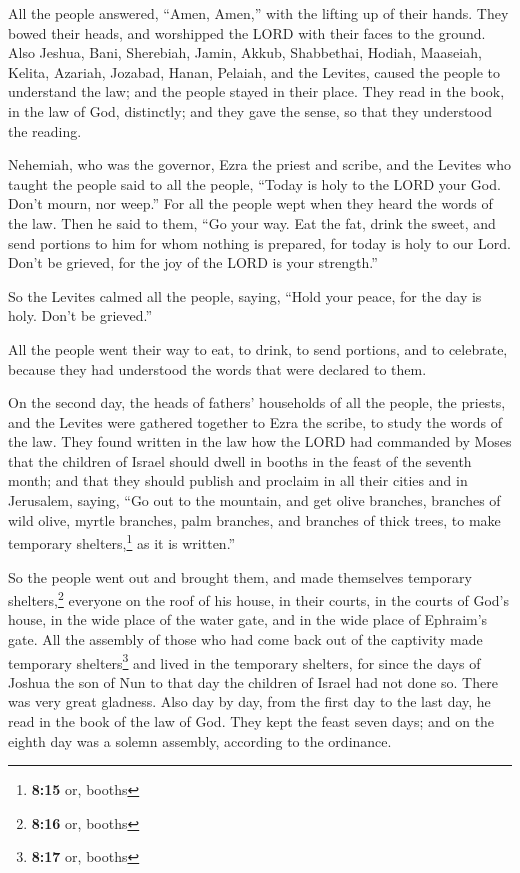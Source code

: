 All the people answered, ``Amen, Amen,'' with the lifting up of their
hands. They bowed their heads, and worshipped the LORD with their faces
to the ground.  Also Jeshua, Bani, Sherebiah, Jamin,
Akkub, Shabbethai, Hodiah, Maaseiah, Kelita, Azariah, Jozabad, Hanan,
Pelaiah, and the Levites, caused the people to understand the law; and
the people stayed in their place.  They read in the book,
in the law of God, distinctly; and they gave the sense, so that they
understood the reading.

 Nehemiah, who was the governor, Ezra the priest and
scribe, and the Levites who taught the people said to all the people,
``Today is holy to the LORD your God. Don't mourn, nor weep.'' For all
the people wept when they heard the words of the law. 
Then he said to them, ``Go your way. Eat the fat, drink the sweet, and
send portions to him for whom nothing is prepared, for today is holy to
our Lord. Don't be grieved, for the joy of the LORD is your strength.''

 So the Levites calmed all the people, saying, ``Hold
your peace, for the day is holy. Don't be grieved.''

 All the people went their way to eat, to drink, to send
portions, and to celebrate, because they had understood the words that
were declared to them.

 On the second day, the heads of fathers' households of
all the people, the priests, and the Levites were gathered together to
Ezra the scribe, to study the words of the law.  They
found written in the law how the LORD had commanded by Moses that the
children of Israel should dwell in booths in the feast of the seventh
month;  and that they should publish and proclaim in all
their cities and in Jerusalem, saying, ``Go out to the mountain, and get
olive branches, branches of wild olive, myrtle branches, palm branches,
and branches of thick trees, to make temporary shelters,\footnote{\textbf{8:15}
  or, booths} as it is written.''

 So the people went out and brought them, and made
themselves temporary shelters,\footnote{\textbf{8:16} or, booths}
everyone on the roof of his house, in their courts, in the courts of
God's house, in the wide place of the water gate, and in the wide place
of Ephraim's gate.  All the assembly of those who had
come back out of the captivity made temporary shelters\footnote{\textbf{8:17}
  or, booths} and lived in the temporary shelters, for since the days of
Joshua the son of Nun to that day the children of Israel had not done
so. There was very great gladness.  Also day by day, from
the first day to the last day, he read in the book of the law of God.
They kept the feast seven days; and on the eighth day was a solemn
assembly, according to the ordinance.

